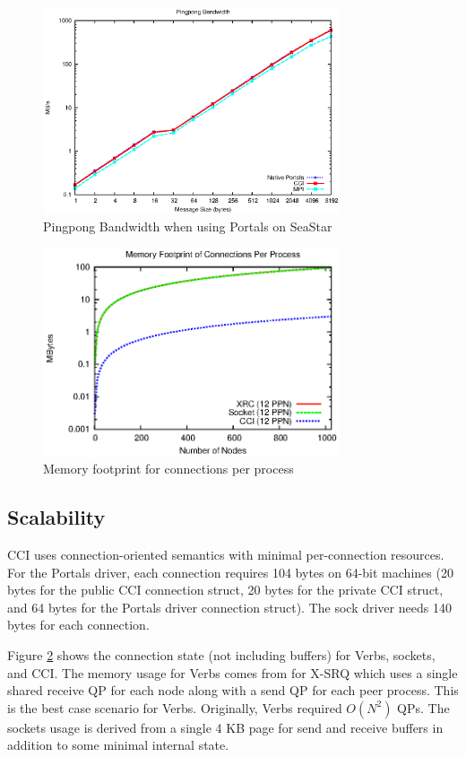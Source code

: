 \begin{figure}[htbp]
\centering
\includegraphics[width=3.45in]{pingpong-bw.eps}
\caption{Pingpong Bandwidth when using Portals on SeaStar}
\label{fig:bw}
\end{figure}

\begin{figure}[htbp]
\centering
\includegraphics[width=3.45in]{memory_log.eps}
\caption{Memory footprint for connections per process}
\label{fig:memory}
\end{figure}

\subsection{Scalability}
CCI uses connection-oriented semantics with minimal per-connection resources.
For the Portals driver, each connection requires 104 bytes on 64-bit machines
(20 bytes for the public CCI connection struct, 20 bytes for the private CCI
struct, and 64 bytes for the Portals driver connection struct).  The sock driver
needs 140 bytes for each connection.

Figure \ref{fig:memory} shows the connection state (not including buffers) for
Verbs, sockets, and CCI. The memory usage for Verbs comes from
\cite{Shipman:2008:XIS:1431669.1431683} for X-SRQ which uses a single shared
receive QP for each node along with a send QP for each peer process. This is
the best case scenario for Verbs. Originally, Verbs required
\begin{math}O(N^2)\end{math} QPs. The sockets usage is derived from a single 4
KB page for send and receive buffers in addition to some minimal internal state.

